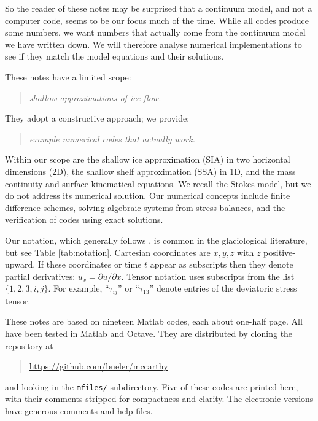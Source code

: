 \documentclass[letterpaper,final,12pt,reqno]{amsart}
\begin{document}
So the reader of these notes may be surprised that a continuum model, and not a computer code, seems to be our focus much of the time.  While all codes produce some numbers, we want numbers that actually come from the continuum model we have written down.  We will therefore analyse numerical implementations to see if they match the model equations and their solutions.

These notes have a limited scope:
  \begin{quote}\emph{shallow approximations of ice flow.}\end{quote}
They adopt a constructive approach; we provide:
  \begin{quote}\emph{example numerical codes that actually work.}\end{quote}
Within our scope are the shallow ice approximation (SIA) in two horizontal dimensions (2D), the shallow shelf approximation (SSA) in 1D, and the mass continuity and surface kinematical equations.  We recall the Stokes model, but we do not address its numerical solution.  Our numerical concepts include finite difference schemes, solving algebraic systems from stress balances, and the verification of codes using exact solutions.

Our notation, which generally follows \cite{GreveBlatter2009}, is common in the glaciological literature, but see Table \ref{tab:notation}.  Cartesian coordinates are $x,y,z$ with $z$ positive-upward.  If these coordinates or time $t$ appear as subscripts then they denote partial derivatives: $u_x = \partial u/\partial x$.  Tensor notation uses subscripts from the list $\{1,2,3,i,j\}$.  For example, ``$\tau_{ij}$'' or ``$\tau_{13}$'' denote entries of the deviatoric stress tensor.

These notes are based on nineteen Matlab codes, each about one-half page.  All have been tested in Matlab and Octave.  They are distributed by cloning the repository at
\begin{quote}
\url{https://github.com/bueler/mccarthy}
\end{quote}
\noindent and looking in the \texttt{mfiles/} subdirectory.  Five of these codes are printed here, with their comments stripped for compactness and clarity.  The electronic versions have generous comments and help files.
\end{document}
